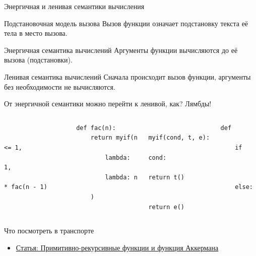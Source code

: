     \begin{frame}[fragile]{Энергичная и ленивая семантики вычисления}
        \pause
        \vspace{-0.7em}
        \begin{block}{Подстановочная модель вызова}
            Вызов функции означает подстановку текста её тела в место вызова.
        \end{block}
        \pause
        \vspace{-0.3em}
        \begin{block}{Энергичная семантика вычислений}
            Аргументы функции вычисляются до её вызова (подстановки).
        \end{block}
        \pause
        \vspace{-0.3em}
        \begin{block}{Ленивая семантика вычислений}
            Сначала происходит вызов функции, аргументы без необходимости не вычисляются.
        \end{block}
        \pause
        От энергичной семантики можно перейти к ленивой, как? \pause Лямбды!
        \pause
        \vspace{-1em}
        \begin{columns}[onlytextwidth]
            \begin{column}[t]{0.485\textwidth}
                \begin{verbatim}
                    def fac(n):
                        return myif(n <= 1,
                            lambda: 1,
                            lambda: n * fac(n - 1)
                        )
                \end{verbatim}
            \end{column}\hfill%
            \begin{column}[t]{0.485\textwidth}
                \begin{verbatim}
                    def myif(cond, t, e):
                        if cond:
                            return t()
                        else:
                            return e()
                \end{verbatim}
            \end{column}
        \end{columns}
    \end{frame}



    \begin{frame}{Что посмотреть в транспорте}
        \begin{itemize}
            \item \href{https://habr.com/ru/articles/486548/}{\color{blue} Статья: Примитивно-рекурсивные функции и функция Аккермана}
        \end{itemize}
    \end{frame}

